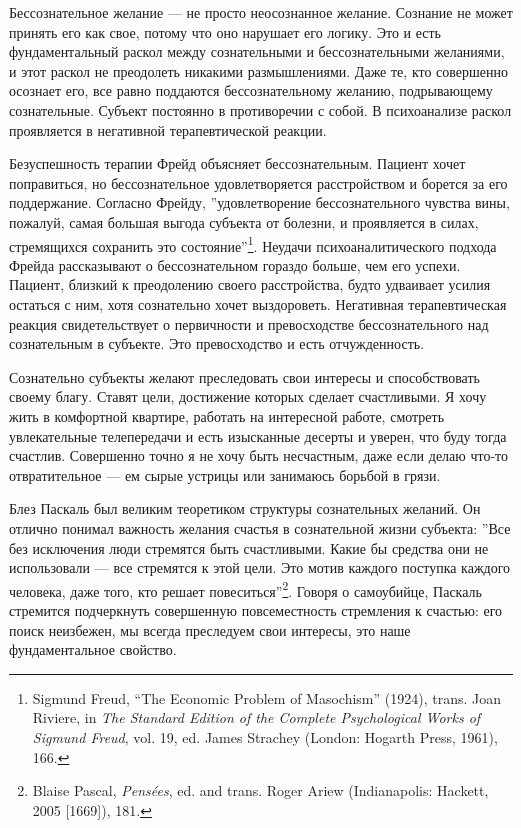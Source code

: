 \documentclass[12pt]{book}
\begin{document}
Бессознательное желание --- не просто неосознанное желание. Сознание не может принять его как свое, потому что оно нарушает его логику. Это и есть фундаментальный раскол между сознательными и бессознательными желаниями, и этот раскол не преодолеть никакими размышлениями. Даже те, кто совершенно осознает его, все равно поддаются бессознательному желанию, подрывающему сознательные. Субъект постоянно в противоречии с собой. В психоанализе раскол проявляется в негативной терапевтической реакции.

Безуспешность терапии Фрейд объясняет бессознательным. Пациент хочет поправиться, но бессознательное удовлетворяется расстройством и борется за его поддержание. Согласно Фрейду, ''удовлетворение бессознательного чувства вины, пожалуй, самая большая выгода субъекта от болезни, и проявляется в силах, стремящихся сохранить это состояние''\footnote{Sigmund Freud, “The Economic Problem of Masochism” (1924), trans. Joan Riviere, in \textit{The Standard Edition of the Complete Psychological Works of Sigmund Freud}, vol. 19, ed. James Strachey (London: Hogarth Press, 1961), 166.}. Неудачи психоаналитического подхода Фрейда рассказывают о бессознательном гораздо больше, чем его успехи. Пациент, близкий к преодолению своего расстройства, будто удваивает усилия остаться с ним, хотя сознательно хочет выздороветь. Негативная терапевтическая реакция свидетельствует о первичности и превосходстве бессознательного над сознательным в субъекте. Это превосходство и есть отчужденность.

Сознательно субъекты желают преследовать свои интересы и способствовать своему благу. Ставят цели, достижение которых сделает счастливыми. Я хочу жить в комфортной квартире, работать на интересной работе, смотреть увлекательные телепередачи и есть изысканные десерты и уверен, что буду тогда счастлив. Совершенно точно я не хочу быть несчастным, даже если делаю что-то отвратительное --- ем сырые устрицы или занимаюсь борьбой в грязи.

Блез Паскаль был великим теоретиком структуры сознательных желаний. Он отлично понимал важность желания счастья в сознательной жизни субъекта: ''Все без исключения люди стремятся быть счастливыми. Какие бы средства они не использовали --- все стремятся к этой цели. Это мотив каждого поступка каждого человека, даже того, кто решает повеситься''\footnote{Blaise Pascal, \textit{Pensées}, ed. and trans. Roger Ariew (Indianapolis: Hackett, 2005 [1669]), 181.}. Говоря о самоубийце, Паскаль стремится подчеркнуть совершенную повсеместность стремления к счастью: его поиск неизбежен, мы всегда преследуем свои интересы, это наше фундаментальное свойство.
\end{document}
